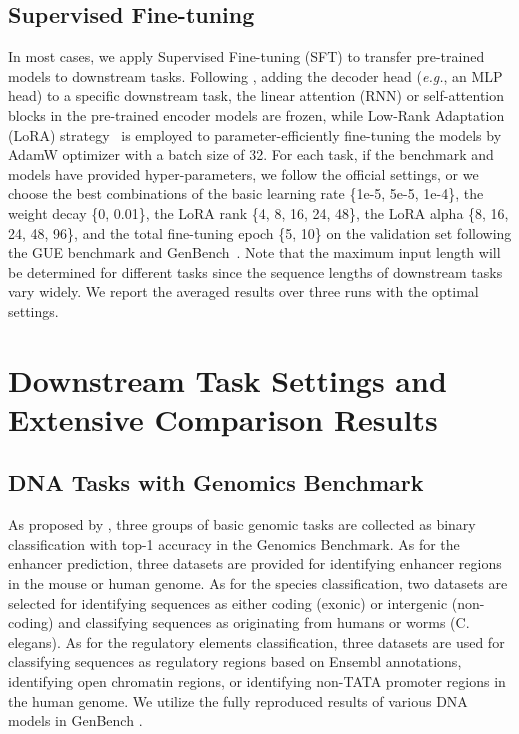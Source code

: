 \subsection{Supervised Fine-tuning}
\label{app:impl_SFT}
In most cases, we apply Supervised Fine-tuning (SFT) to transfer pre-trained models to downstream tasks. Following \citep{nips2024hyenadna, iclr2024dnabert2}, adding the decoder head (\textit{e.g.}, an MLP head) to a specific downstream task, the linear attention (RNN) or self-attention blocks in the pre-trained encoder models are frozen, while Low-Rank Adaptation (LoRA) strategy~\citep{Hu2021LoRA} is employed to parameter-efficiently fine-tuning the models by AdamW optimizer with a batch size of 32. For each task, if the benchmark and models have provided hyper-parameters, we follow the official settings, or we choose the best combinations of the basic learning rate \{1e-5, 5e-5, 1e-4\}, the weight decay \{0, 0.01\}, the LoRA rank \{4, 8, 16, 24, 48\}, the LoRA alpha \{8, 16, 24, 48, 96\}, and the total fine-tuning epoch \{5, 10\} on the validation set following the GUE benchmark and GenBench~\citep{liu2024genbench}. Note that the maximum input length will be determined for different tasks since the sequence lengths of downstream tasks vary widely. We report the averaged results over three runs with the optimal settings.





\section{Downstream Task Settings and Extensive Comparison Results}
\label{app:additional_res}
% 
\subsection{DNA Tasks with Genomics Benchmark}
As proposed by \citep{BMC2023genomicbenchmark}, three groups of basic genomic tasks are collected as binary classification with top-1 accuracy in the Genomics Benchmark. As for the enhancer prediction, three datasets are provided for identifying enhancer regions in the mouse or human genome. As for the species classification, two datasets are selected for identifying sequences as either coding (exonic) or intergenic (non-coding) and classifying sequences as originating from humans or worms (C. elegans). As for the regulatory elements classification, three datasets are used for classifying sequences as regulatory regions based on Ensembl annotations, identifying open chromatin regions, or identifying non-TATA promoter regions in the human genome. We utilize the fully reproduced results of various DNA models in GenBench \citep{liu2024genbench}.


